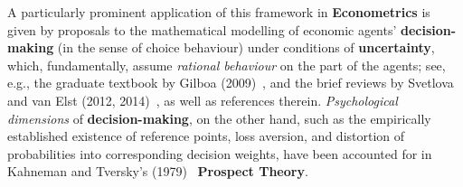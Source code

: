 \medskip
\noindent
A particularly prominent application of this framework in
\textbf{Econometrics} is given by proposals to the mathematical
modelling of economic agents' \textbf{decision-making} (in the
sense of choice behaviour) under conditions of
\textbf{uncertainty}, which, fundamentally, assume \textit{rational
behaviour} on the part of the agents; see, e.g., the graduate
textbook by Gilboa (2009)~, and the brief reviews by
Svetlova and van Elst (2012, 2014)~, as
well as references therein. \textit{Psychological dimensions} of 
\textbf{decision-making}, on the other hand, such as the
empirically established existence of reference points, loss
aversion, and distortion of probabilities into corresponding
decision weights, have been accounted for in Kahneman and Tversky's 
(1979)~ \textbf{Prospect Theory}.

